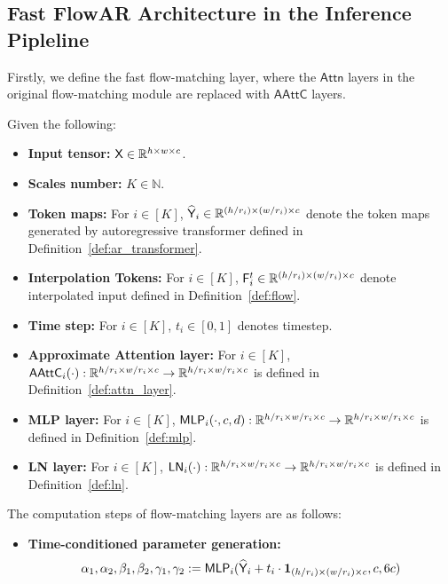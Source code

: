 \subsection{Fast FlowAR Architecture in the Inference Pipleline}\label{sec:fast_flowar}
Firstly, we define the fast flow-matching layer, where the $\mathsf{Attn}$ layers in the original flow-matching module are replaced with $\mathsf{AAttC}$ layers.


\begin{definition}\label{def:fast_flow_matching_architecture}
Given the following:
\begin{itemize}
    \item {\bf Input tensor:} $\mathsf{X} \in \mathbb{R}^{h \times w \times c}$.
    \item {\bf Scales number:} $K \in \mathbb{N}$.
    \item {\bf Token maps:} For $i \in [K]$, $\widehat{\mathsf{Y}}_i \in \mathbb{R}^{(h / r_i) \times (w/r_i) \times c}$ denote the token maps generated by autoregressive transformer defined in Definition~\ref{def:ar_transformer}.
    \item {\bf Interpolation Tokens:} For $i \in [K]$, $\mathsf{F}_i^t \in \mathbb{R}^{(h / r_i) \times (w/r_i) \times c}$ denote interpolated input defined in Definition~\ref{def:flow}.
    \item {\bf Time step:} For $i \in [K]$, $t_i \in [0,1]$ denotes timestep.
    \item {\bf Approximate Attention layer:}  For $i \in [K]$, $\mathsf{AAttC}_i(\cdot):\mathbb{R}^{h/r_i \times w/r_i \times c} \to \mathbb{R}^{h/r_i \times w/r_i \times c}$ is defined in Definition~\ref{def:attn_layer}.
    \item {\bf MLP layer:}  For $i \in [K]$, $\mathsf{MLP}_i(\cdot,c,d):\mathbb{R}^{h/r_i \times w/r_i \times c} \to \mathbb{R}^{h/r_i \times w/r_i \times c}$ is defined in Definition~\ref{def:mlp}.
    \item {\bf LN layer:} For $i \in [K]$, $\mathsf{LN}_i(\cdot):\mathbb{R}^{h/r_i \times w/r_i \times c} \to \mathbb{R}^{h/r_i \times w/r_i \times c}$ is defined in Definition~\ref{def:ln}.
\end{itemize}
The computation steps of flow-matching layers are as follows:
\begin{itemize}
    \item {\bf Time-conditioned parameter generation:}
    \begin{align*}
        \alpha_1, \alpha_2, \beta_1, \beta_2, \gamma_1, \gamma_2:=  \mathsf{MLP}_i(\wh{\Y}_i + t_i \cdot {\bf 1}_{(h / r_i) \times (w/r_i) \times c},c,6c)

\end{align*}
\end{itemize}
\end{definition}
